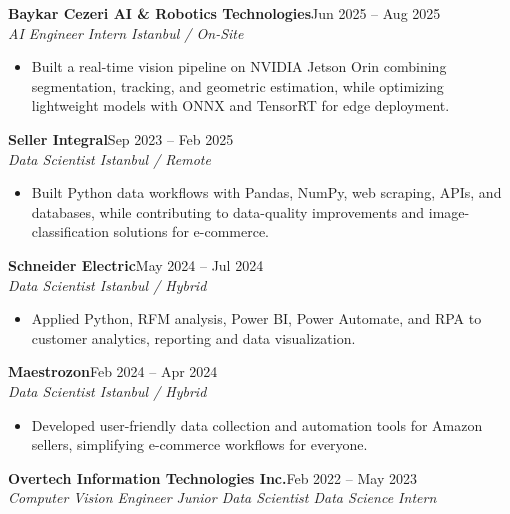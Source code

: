 \documentclass[a4paper,10pt]{article}
\newcommand{\entry}[3]{
    \textbf{#1}\hfill #2\\[-1pt]
    \textit{#3}\par
}
\begin{document}
\entry
{Baykar Cezeri AI \& Robotics Technologies}
{Jun 2025 -- Aug 2025}
{AI Engineer Intern  \textperiodcentered{} Istanbul / On-Site}

\begin{itemize}
    \item Built a real-time vision pipeline on NVIDIA Jetson Orin combining segmentation, tracking, and geometric estimation, while optimizing lightweight models with ONNX and TensorRT for edge deployment.
\end{itemize}

\vspace{1pt}

\entry
{Seller Integral}
{Sep 2023 -- Feb 2025}
{Data Scientist \textperiodcentered{} Istanbul / Remote}

\begin{itemize}
    \item Built Python data workflows with Pandas, NumPy, web scraping, APIs, and databases, while contributing to data-quality improvements and image-classification solutions for e-commerce.
\end{itemize}

\vspace{1pt}


\entry
{Schneider Electric}
{May 2024 -- Jul 2024}
{Data Scientist \textperiodcentered{} Istanbul / Hybrid}

\begin{itemize}
    \item Applied Python, RFM analysis, Power BI, Power Automate, and RPA to customer analytics, reporting and data visualization.
\end{itemize}

\vspace{1pt}
\entry
{Maestrozon}
{Feb 2024 -- Apr 2024}
{Data Scientist \textperiodcentered{} Istanbul / Hybrid}

\begin{itemize}
    \item Developed user-friendly data collection and automation tools for Amazon sellers, simplifying e-commerce workflows for everyone.
\end{itemize}

\vspace{1pt}

\entry
{Overtech Information Technologies Inc.}
{Feb 2022 -- May 2023}
{Computer Vision Engineer \textperiodcentered{} Junior Data Scientist \textperiodcentered{} Data Science Intern}
\end{document}
